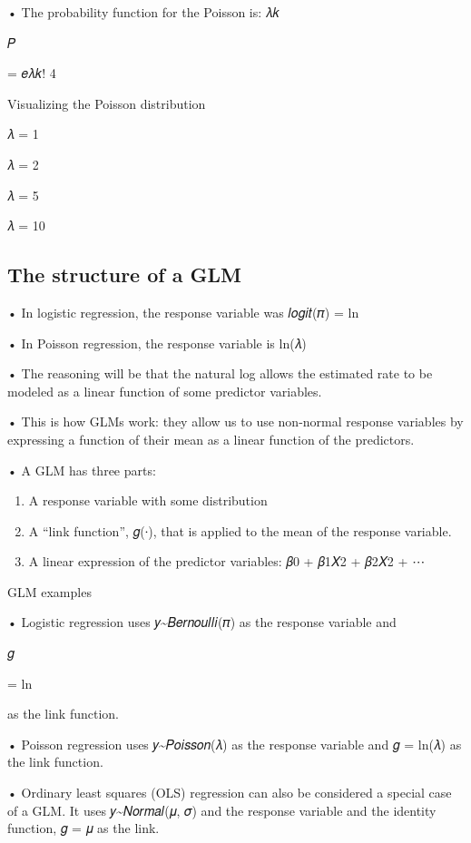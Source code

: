 \documentclass[
  letterpaper,
  DIV=11,
  numbers=noendperiod]{scrreprt}
\begin{document}
• The probability function for the Poisson is: 𝜆𝑘

𝑃

= 𝑒𝜆𝑘! 4

Visualizing the Poisson distribution

𝜆 = 1

𝜆 = 2

𝜆 = 5

𝜆 = 10

\hypertarget{the-structure-of-a-glm}{%
\subsection{The structure of a GLM}\label{the-structure-of-a-glm}}

• In logistic regression, the response variable was 𝑙𝑜𝑔𝑖𝑡(𝜋) = ln

• In Poisson regression, the response variable is ln(𝜆)

• The reasoning will be that the natural log allows the estimated rate
to be modeled as a linear function of some predictor variables.

• This is how GLMs work: they allow us to use non-normal response
variables by expressing a function of their mean as a linear function of
the predictors.

• A GLM has three parts:

\begin{enumerate}
\def\labelenumi{\arabic{enumi}.}
\item
  A response variable with some distribution
\item
  A ``link function'', 𝑔(∙), that is applied to the mean of the response
  variable.
\item
  A linear expression of the predictor variables: 𝛽0 + 𝛽1𝑋2 + 𝛽2𝑋2 + ⋯
\end{enumerate}

GLM examples

• Logistic regression uses 𝑦\textasciitilde 𝐵𝑒𝑟𝑛𝑜𝑢𝑙𝑙𝑖(𝜋) as the response
variable and

𝑔

= ln

as the link function.

• Poisson regression uses 𝑦\textasciitilde 𝑃𝑜𝑖𝑠𝑠𝑜𝑛(𝜆) as the response
variable and 𝑔 = ln(𝜆) as the link function.

• Ordinary least squares (OLS) regression can also be considered a
special case of a GLM. It uses 𝑦\textasciitilde 𝑁𝑜𝑟𝑚𝑎𝑙(𝜇, 𝜎) and the
response variable and the identity function, 𝑔 = 𝜇 as the link.
\end{document}
